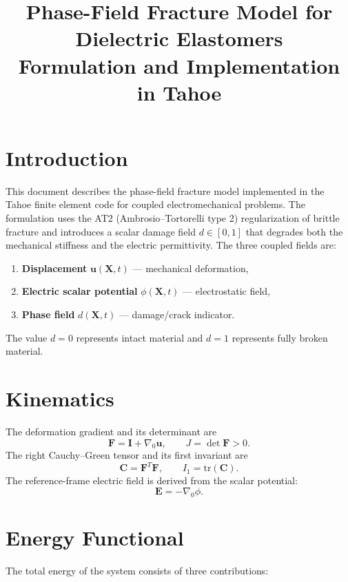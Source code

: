 \documentclass[11pt,a4paper]{article}
\title{Phase-Field Fracture Model for Dielectric Elastomers\\[4pt]
\large Formulation and Implementation in Tahoe}
\author{}
\date{}
\newcommand{\FF}{\bm{F}}
\newcommand{\CC}{\bm{C}}
\newcommand{\EE}{\bm{E}}
\newcommand{\II}{\bm{I}}
\newcommand{\uu}{\bm{u}}
\newcommand{\XX}{\bm{X}}
\newcommand{\Grad}{\nabla_{\!0}}
\newcommand{\tr}{\mathrm{tr}}
\begin{document}
\maketitle

\section{Introduction}

This document describes the phase-field fracture model implemented in the Tahoe finite element code for coupled electromechanical problems. The formulation uses the AT2 (Ambrosio--Tortorelli type 2) regularization of brittle fracture and introduces a scalar damage field $d \in [0,1]$ that degrades both the mechanical stiffness and the electric permittivity. The three coupled fields are:
\begin{enumerate}[nosep]
    \item \textbf{Displacement} $\uu(\XX,t)$ --- mechanical deformation,
    \item \textbf{Electric scalar potential} $\phi(\XX,t)$ --- electrostatic field,
    \item \textbf{Phase field} $d(\XX,t)$ --- damage/crack indicator.
\end{enumerate}
The value $d=0$ represents intact material and $d=1$ represents fully broken material.

\section{Kinematics}

The deformation gradient and its determinant are
\begin{equation}
    \FF = \II + \Grad \uu, \qquad J = \det \FF > 0.
\end{equation}
The right Cauchy--Green tensor and its first invariant are
\begin{equation}
    \CC = \FF^T \FF, \qquad I_1 = \tr(\CC).
\end{equation}
The reference-frame electric field is derived from the scalar potential:
\begin{equation}
    \EE = -\Grad \phi.
\end{equation}

\section{Energy Functional}

The total energy of the system consists of three contributions:
\end{document}

